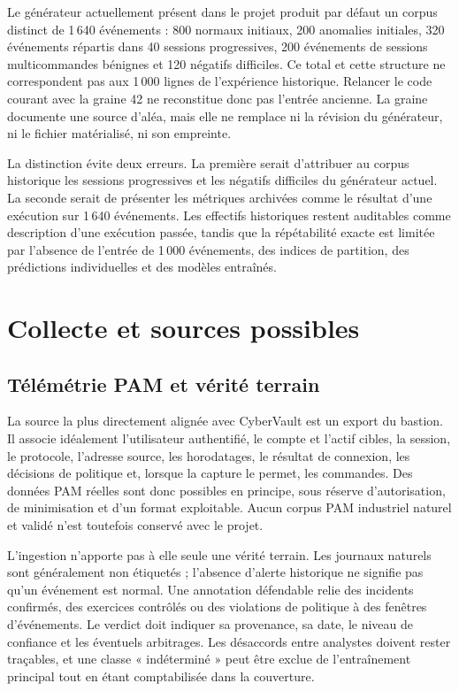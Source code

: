 \documentclass[11pt,a4paper,oneside]{report}
\theoremstyle{definition}
\theoremstyle{plain}
\begin{document}
Le générateur actuellement présent dans le projet produit par défaut un corpus
distinct de 1\,640 événements : 800 normaux initiaux, 200 anomalies initiales,
320 événements répartis dans 40 sessions progressives, 200 événements de
sessions multicommandes bénignes et 120 négatifs difficiles. Ce total et cette
structure ne correspondent pas aux 1\,000 lignes de l'expérience historique.
Relancer le code courant avec la graine 42 ne reconstitue donc pas l'entrée
ancienne. La graine documente une source d'aléa, mais elle ne remplace ni la
révision du générateur, ni le fichier matérialisé, ni son empreinte.

La distinction évite deux erreurs. La première serait d'attribuer au corpus
historique les sessions progressives et les négatifs difficiles du générateur
actuel. La seconde serait de présenter les métriques archivées comme le résultat
d'une exécution sur 1\,640 événements. Les effectifs historiques restent
auditables comme description d'une exécution passée, tandis que la répétabilité
exacte est limitée par l'absence de l'entrée de 1\,000 événements, des indices
de partition, des prédictions individuelles et des modèles entraînés.

\section{Collecte et sources possibles}
\label{sec:data-sources}

\subsection{Télémétrie PAM et vérité terrain}

La source la plus directement alignée avec CyberVault est un export du bastion.
Il associe idéalement l'utilisateur authentifié, le compte et l'actif cibles,
la session, le protocole, l'adresse source, les horodatages, le résultat de
connexion, les décisions de politique et, lorsque la capture le permet, les
commandes. Des données PAM réelles sont donc possibles en principe, sous
réserve d'autorisation, de minimisation et d'un format exploitable. Aucun corpus
PAM industriel naturel et validé n'est toutefois conservé avec le projet.

L'ingestion n'apporte pas à elle seule une vérité terrain. Les journaux naturels
sont généralement non étiquetés ; l'absence d'alerte historique ne signifie pas
qu'un événement est normal. Une annotation défendable relie des incidents
confirmés, des exercices contrôlés ou des violations de politique à des
fenêtres d'événements. Le verdict doit indiquer sa provenance, sa date, le
niveau de confiance et les éventuels arbitrages. Les désaccords entre analystes
doivent rester traçables, et une classe « indéterminé » peut être exclue de
l'entraînement principal tout en étant comptabilisée dans la couverture.
\end{document}
